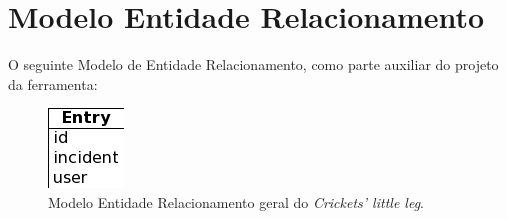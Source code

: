 \clearpage
\section{Modelo Entidade Relacionamento}

O seguinte Modelo de Entidade Relacionamento, como parte auxiliar do projeto da ferramenta:

\begin{figure}[hc]
    \begin{center}
        \includegraphics[scale=0.8]{./figuras/diagramaER.png}

        \caption{Modelo Entidade Relacionamento geral do \textit{Crickets' little leg}.}
    \end{center}
\end{figure}
